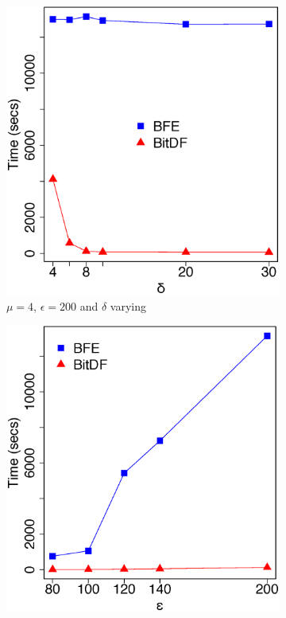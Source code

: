 {\begin{figure}[h!]
    \centering
    \begin{subfigure}[t]{0.48\textwidth}
        \includegraphics[width=\textwidth]{images/Brinkhoff_n_4_g_200_varying_l.eps}
        \caption{$\mu = 4$, $\epsilon = 200$ and $\delta$ varying}
        \label{fig:brinkhoff_vary_l}
    \end{subfigure}
    \begin{subfigure}[t]{0.48\textwidth}
        \includegraphics[width=\textwidth]{images/Brinkhoff_n_4_l_8_varying_g.eps}

\end{subfigure}
\end{figure}}

